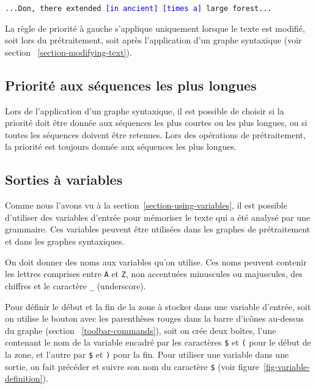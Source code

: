 \begin{center}
\texttt{...Don, there extended \textcolor{blue}{[in ancient] [times a]} large forest...}
\end{center}

\noindent La règle de priorité à gauche s’applique uniquement lorsque le texte est modifié, soit lors
du prétraitement, soit après l’application d’un graphe syntaxique (voir section 
~\ref{section-modifying-text}).

\subsection{Priorité aux séquences les plus longues}
Lors de l’application d’un graphe syntaxique, il est possible de choisir si la priorité doit
être donnée aux séquences les plus courtes ou les plus longues, ou si toutes les séquences
doivent être retenues. Lors des opérations de prétraitement, la priorité est toujours donnée
aux séquences les plus longues.


\subsection{Sorties à variables}
\label{section-variables}
Comme nous l’avons vu à la section~\ref{section-using-variables}, il est possible d’utiliser
des variables d'entrée pour mémoriser le texte qui a été analysé par une grammaire. Ces variables
peuvent être utilisées dans les graphes de prétraitement et dans les graphes syntaxiques.

\bigskip
\noindent On doit donner des noms aux variables qu'on utilise. Ces noms peuvent contenir
les lettres comprises entre \verb+A+ et \verb+Z+, non accentuées minuscules ou majuscules, 
des chiffres et le caractère \verb+_+ (underscore).

\bigskip
\noindent Pour définir le début et la fin de la zone à stocker dans une variable d'entrée,
soit on utilise le bouton avec les parenthèses rouges dans la barre d'icônes au-dessus du graphe
(section ~\ref{toolbar-commands}),
soit on crée deux boîtes, l'une contenant le nom de la variable encadré par les caractères
\verb-$- et \verb-(- pour le début de la zone, et l'autre par \verb-$- et \verb-)- pour la fin.
Pour utiliser une variable dans une sortie, on fait précéder et suivre son nom du caractère \verb-$-
 (voir figure~\ref{fig-variable-definition}).

